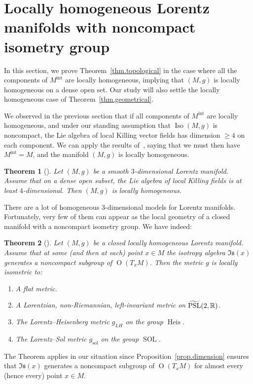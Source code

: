 \documentclass[11pt]{article}
\newtheorem{theo}{Theorem}[section]
\theoremstyle{definition}
\numberwithin{equation}{section}
\numberwithin{figure}{section}
\numberwithin{table}{section}
\DeclareMathOperator{\Iso}{Iso}
\DeclareMathOperator{\PSL}{PSL}
\DeclareMathOperator{\Omp}{O}%
\DeclareMathOperator{\sol}{sol}
\newcommand{\mint}{{M^{\intl}}}
\DeclareMathOperator{\intl}{int}
\DeclareMathOperator{\Heis}{Heis}
\DeclareMathOperator{\SOL}{SOL}
\newcommand*\RR{\mathbb{R}}
\let\oldtilde\tilde
\renewcommand*\tilde[1]{\mathchoice{\widetilde{#1}}{\widetilde{#1}}{\widetilde{#1}}{\oldtilde{#1}}}
\begin{document}
\section{Locally homogeneous Lorentz manifolds with noncompact isometry group}\label{sec.homogeneous}

In this section, we prove Theorem~\ref{thm.topological} in the case where all the components of $\mint$ are locally homogeneous, implying that $(M,g)$ is locally homogeneous on a dense open set. Our study will also settle the locally homogeneous case of Theorem~\ref{thm.geometrical}.

We observed in the previous section that if all components of $\mint$ are locally homogeneous, and under our standing assumption that $\Iso(M,g)$ is noncompact, the Lie algebra of local Killing vector fields has dimension $\geq 4$ on each component. We can apply the results of~\cite{frances.open}, saying that we must then have $\mint=M$, and the manifold $(M,g)$ is locally homogeneous.

\begin{theo}[{\cite[Theorem~B]{frances.open}}]\label{thm.quasihomogeneous}
Let $(M,g)$ be a smooth $3$-dimensional Lorentz manifold. Assume that on a dense open subset, the Lie algebra of local Killing fields is at least $4$-dimensional. Then $(M,g)$ is locally homogeneous.
\end{theo}

There are a lot of homogeneous $3$-dimensional models for Lorentz manifolds. Fortunately, very few of them can appear as the local geometry of a closed manifold with a noncompact isometry group. We have indeed:


\begin{theo}[{\cite[Theorem~2.1]{sorin.ghani}}]\label{thm.ghanisorin}
Let $(M,g)$ be a closed locally homogeneous Lorentz manifold. Assume that at some (and then at each) point $x \in M$ the isotropy algebra $\mathfrak{Is}(x)$ generates a noncompact subgroup of $\Omp(T_xM)$. Then the metric $g$ is locally isometric to:
\begin{enumerate}
\item \label{list4.2.1}A flat metric.
\item \label{list4.2.2}A Lorentzian, non-Riemannian, left-invariant metric on $\tilde{\PSL}(2,\RR)$.
\item \label{list4.2.3}The Lorentz--Heisenberg metric $g_{LH}$ on the group $\Heis$.
\item \label{list4.2.4}The Lorentz--Sol metric $g_{\sol}$ on the group $\SOL$.
\end{enumerate}
\end{theo}
The Theorem applies in our situation since Proposition~\ref{prop.dimension} ensures that $\mathfrak{Is}(x)$ generates a noncompact subgroup of $\Omp(T_xM)$ for almost every (hence every) point $x \in M$.
\end{document}

